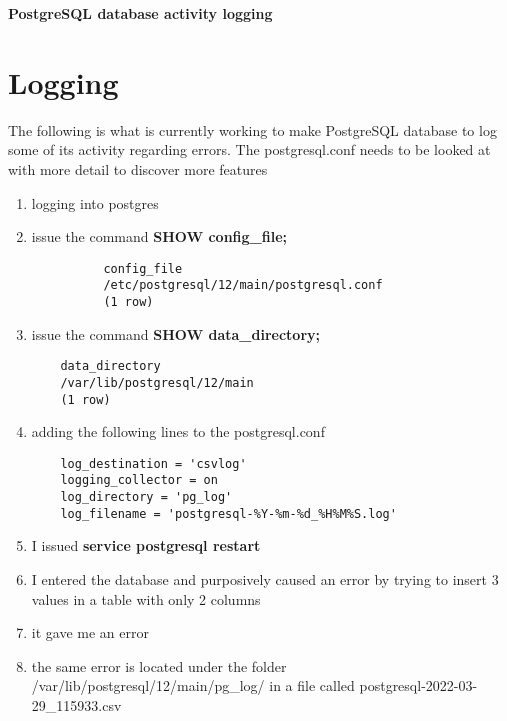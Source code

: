 \documentclass[a4paper,12pt]{article}
\begin{document}
\textbf{PostgreSQL database activity logging}


\tableofcontents
\clearpage

\section{Logging}

The following is what is currently working to make PostgreSQL database to log some of its activity regarding errors. The postgresql.conf needs to be looked at with more detail to discover more features
\begin{enumerate}
\item {logging into postgres}
\item {issue the command \textbf{SHOW config\_file;}}\footnotemark{}
    
 
          \begin{lstlisting}
          config_file   
          /etc/postgresql/12/main/postgresql.conf
          (1 row)
          \end{lstlisting}


\item{issue the command \textbf{SHOW data\_directory;}}\footnotemark{}
    
    \begin{lstlisting}
    data_directory        
    /var/lib/postgresql/12/main
    (1 row)
    \end{lstlisting}

\item {adding the following lines to the postgresql.conf}
   
    \begin{lstlisting}
    log_destination = 'csvlog'
    logging_collector = on
    log_directory = 'pg_log'
    log_filename = 'postgresql-%Y-%m-%d_%H%M%S.log'
    \end{lstlisting}

\item{I issued \textbf{service postgresql restart}}
\item{I entered the database and purposively caused an error by trying to insert 3 values in a table with only 2 columns}
\item{it gave me an error}
\item{the same error is located under the folder /var/lib/postgresql/12/main/pg\_log/ in a file called postgresql-2022-03-29\_115933.csv}


\end{enumerate}
\end{document}
